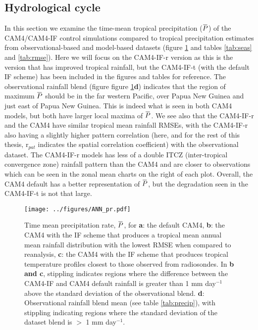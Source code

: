 \documentclass[letterpaper,12pt,titlepage,oneside,final]{book}
\newcommand{\overbar}[1]{\mkern 1.5mu\overline{\mkern-1.5mu#1\mkern-1.5mu}\mkern 1.5mu}
\begin{document}
\subsection{Hydrological cycle}

In this section we examine the time-mean tropical precipitation ($\overbar{P}$) of the CAM4/CAM4-IF control simulations compared to tropical precipitation estimates from observational-based and model-based datasets (figure \ref{fig:P} and tables \ref{tab:seas} and \ref{tab:rmse}). Here we will focus on the CAM4-IF-r version as this is the version that has improved tropical rainfall, but the CAM4-IF-t (with the default IF scheme) has been included in the figures and tables for reference. The observational rainfall blend (figure figure \ref{fig:P}\textbf{d})  indicates that the region of maximum $\overbar{P}$ should be in the far western Pacific, over Papua New Guinea and just east of Papua New Guinea. This is indeed what is seen in both CAM4 models, but both have larger local maxima of $\overbar{P}$. We see also that the CAM4-IF-r and the CAM4 have similar tropical mean rainfall RMSEs, with the CAM4-IF-r also having a slightly higher pattern correlation (here, and for the rest of this thesis, r$_{pat}$ indicates the spatial correlation coefficient) with the observational dataset. The CAM4-IF-r models has less of a double ITCZ (inter-tropical convergence zone) rainfall pattern \citep{mechoso_seasonal_1995} than the CAM4 and are closer to observations which can be seen in the zonal mean charts on the right of each plot. Overall, the CAM4 default has a better representation of $\overbar{P}$, but the degradation seen in the CAM4-IF-t is not that large.


\begin{figure}[H]
\centering
\noindent\texttt{[image: ../figures/ANN\_pr.pdf]}\hfill
\caption{\footnotesize Time mean precipitation rate, $\overbar{P}$, for \textbf{a}: the default CAM4, \textbf{b}: the CAM4 with the IF scheme that produces a tropical mean annual mean rainfall distribution with the lowest RMSE when compared to reanalysis, \textbf{c}: the CAM4 with the IF scheme that produces tropical temperature profiles closest to those observed from radiosondes. In \textbf{b and c}, stippling indicates regions where the difference between the CAM4-IF and CAM4 default rainfall is greater than 1 mm day$^{-1}$ above the standard deviation of the observational blend. \textbf{d}: Observational rainfall blend mean (see table \ref{tab:precip}), with stippling indicating regions where the standard deviation of the dataset blend is $>$ 1 mm day$^{-1}$.}
\label{fig:P}
\end{figure}
\end{document}
